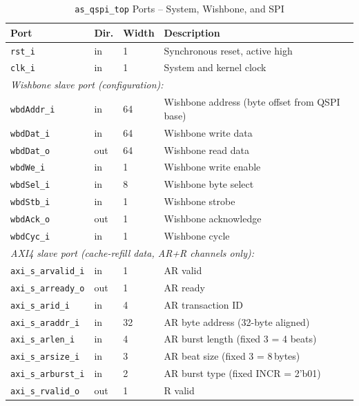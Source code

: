 \begin{table}[H]
\caption{\texttt{as\_qspi\_top} Ports -- System, Wishbone, and SPI}
\label{tab:asQspiPer06}
\centering
\begin{tabularx}{\textwidth}{|l|l|l|X|}
  \hline
  Port & Dir. & Width & Description \\
  \hline\hline
  \texttt{rst\_i}       & in  & 1  & Synchronous reset, active high \\
  \hline
  \texttt{clk\_i}       & in  & 1  & System and kernel clock \\
  \hline
  \multicolumn{4}{|l|}{\textit{Wishbone slave port (configuration):}} \\
  \hline
  \texttt{wbdAddr\_i}   & in  & 64 & Wishbone address (byte offset from QSPI base) \\
  \hline
  \texttt{wbdDat\_i}    & in  & 64 & Wishbone write data \\
  \hline
  \texttt{wbdDat\_o}    & out & 64 & Wishbone read data \\
  \hline
  \texttt{wbdWe\_i}     & in  & 1  & Wishbone write enable \\
  \hline
  \texttt{wbdSel\_i}    & in  & 8  & Wishbone byte select \\
  \hline
  \texttt{wbdStb\_i}    & in  & 1  & Wishbone strobe \\
  \hline
  \texttt{wbdAck\_o}    & out & 1  & Wishbone acknowledge \\
  \hline
  \texttt{wbdCyc\_i}    & in  & 1  & Wishbone cycle \\
  \hline
  \multicolumn{4}{|l|}{\textit{AXI4 slave port (cache-refill data, AR+R channels only):}} \\
  \hline
  \texttt{axi\_s\_arvalid\_i} & in  & 1  & AR valid \\
  \hline
  \texttt{axi\_s\_arready\_o} & out & 1  & AR ready \\
  \hline
  \texttt{axi\_s\_arid\_i}    & in  & 4  & AR transaction ID \\
  \hline
  \texttt{axi\_s\_araddr\_i}  & in  & 32 & AR byte address (32-byte aligned) \\
  \hline
  \texttt{axi\_s\_arlen\_i}   & in  & 4  & AR burst length (fixed 3 = 4 beats) \\
  \hline
  \texttt{axi\_s\_arsize\_i}  & in  & 3  & AR beat size (fixed 3 = 8\,bytes) \\
  \hline
  \texttt{axi\_s\_arburst\_i} & in  & 2  & AR burst type (fixed INCR = 2'b01) \\
  \hline
  \texttt{axi\_s\_rvalid\_o}  & out & 1  & R valid \\

\end{tabularx}
\end{table}
